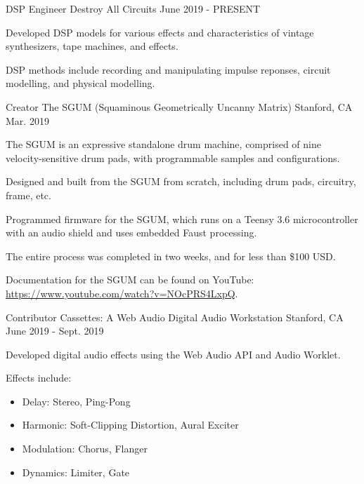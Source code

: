 \begin{cventries}
    \cventry
    {DSP Engineer} %
    {Destroy All Circuits} %
    {} %
    {June 2019 - PRESENT} %
    {
      \begin{cvitems} %
        \item {Developed DSP models for various effects and characteristics of vintage synthesizers, tape machines, and effects.}
        \item {DSP methods include recording and manipulating impulse reponses, circuit modelling, and physical modelling.}
      \end{cvitems}
    }

    \cventry
    {Creator} %
    {The SGUM (Squaminous Geometrically Uncanny Matrix)} %
    {Stanford, CA} %
    {Mar. 2019} %
    {
      \begin{cvitems} %
        \item {The SGUM is an expressive standalone drum machine, comprised of nine velocity-sensitive drum pads, with programmable samples and configurations.}
        \item {Designed and built from the SGUM from scratch, including drum pads, circuitry, frame, etc.}
        \item {Programmed firmware for the SGUM, which runs on a Teensy 3.6 microcontroller with an audio shield and uses embedded Faust processing.}
        \item {The entire process was completed in two weeks, and for less than \$100 USD.}
        \item {Documentation for the SGUM can be found on YouTube: \url{https://www.youtube.com/watch?v=NOcPRS4LxpQ}.}
      \end{cvitems}
    }

    \cventry
    {Contributor} %
    {Cassettes: A Web Audio Digital Audio Workstation} %
    {Stanford, CA} %
    {June 2019 - Sept. 2019} %
    {
      \begin{cvitems} %
        \item {Developed digital audio effects using the Web Audio API and Audio Worklet.}
        \item {Effects include:}
        \begin{itemize}
            \item {Delay: Stereo, Ping-Pong}
            \item {Harmonic: Soft-Clipping Distortion, Aural Exciter}
            \item {Modulation: Chorus, Flanger}
            \item {Dynamics: Limiter, Gate}
        \end{itemize}
      \end{cvitems}
    }


\end{cventries}
